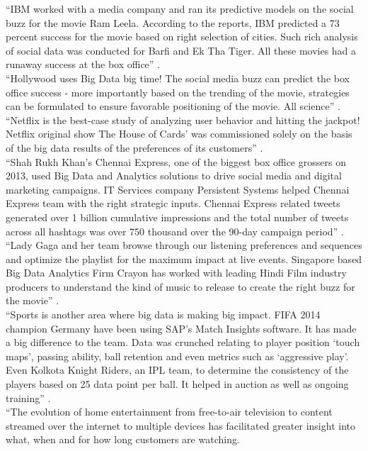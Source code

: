 \documentclass[sigconf]{acmart}
\begin{document}
``IBM worked with a media company and ran its predictive models on the social buzz for the movie Ram Leela. According to the reports, IBM predicted a 73 percent success for the movie based on right selection of cities. Such rich analysis of social data was conducted for Barfi and Ek Tha Tiger. All these movies had a runaway success at the box office'' \cite{Karania2014industry}. \\
``Hollywood uses Big Data big time! The social media buzz can predict the box office success - more importantly based on the trending of the movie, strategies can be formulated to ensure favorable positioning of the movie. All science'' \cite{Karania2014industry}. \\
``Netflix is the best-case study of analyzing user behavior and hitting the jackpot! Netflix original show The House of Cards' was commissioned solely on the basis of the big data results of the preferences of its customers'' \cite{Karania2014industry}. \\
``Shah Rukh Khan's Chennai Express, one of the biggest box office grossers on 2013, used Big Data and Analytics solutions to drive social media and digital marketing campaigns. IT Services company Persistent Systems helped Chennai Express team with the right strategic inputs. Chennai Express related tweets generated over 1 billion cumulative impressions and the total number of tweets across all hashtags was over 750 thousand over the 90-day campaign period'' \cite{Karania2014industry}. \\
``Lady Gaga and her team browse through our listening preferences and sequences and optimize the playlist for the maximum impact at live events. Singapore based Big Data Analytics Firm Crayon has worked with leading Hindi Film industry producers to understand the kind of music to release to create the right buzz for the movie'' \cite{Karania2014industry}. \\
``Sports is another area where big data is making big impact. FIFA 2014 champion Germany have been using SAP’s Match Insights software. It has made a big difference to the team. Data was crunched relating to player position `touch maps', passing ability, ball retention and even metrics such as `aggressive play'. Even Kolkota Knight Riders, an IPL team, to determine the consistency of the players based on 25 data point per ball. It helped in auction as well as ongoing training'' \cite{Karania2014industry}. \\
``The evolution of home entertainment from free-to-air television to content streamed over the internet to multiple devices has facilitated greater insight into what, when and for how long customers are watching.
\end{document}
